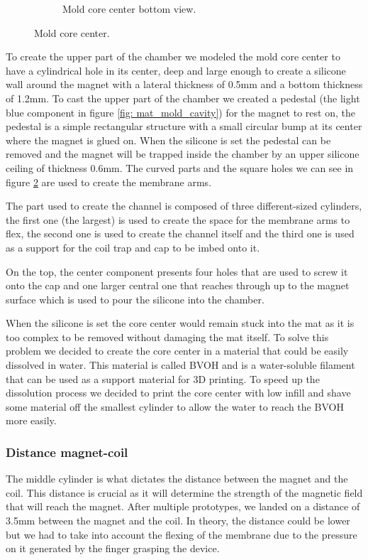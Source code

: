 \begin{figure}
\begin{subfigure}[b]{0.475\textwidth}
{        }
        \caption{Mold core center bottom view.}
        \label{fig: mat_mold_core_center_btm}
    \end{subfigure}
    \caption{Mold core center.}
    \label{fig: mat_mold_core_center}
\end{figure}
To create the upper part of the chamber we modeled the mold core center to have a cylindrical hole in its center, deep and large enough to create a silicone wall around the magnet with a lateral thickness of 0.5mm and a bottom thickness of 1.2mm.
To cast the upper part of the chamber we created a pedestal (the light blue component in figure \ref{fig: mat_mold_cavity}) for the magnet to rest on, the pedestal is a simple rectangular structure with a small circular bump at its center where the magnet is glued on.
When the silicone is set the pedestal can be removed and the magnet will be trapped inside the chamber by an upper silicone ceiling of thickness 0.6mm.
The curved parts and the square holes we can see in figure \ref{fig: mat_mold_core_center} are used to create the membrane arms.

The part used to create the channel is composed of three different-sized cylinders, the first one (the largest) is used to create the space for the membrane arms to flex, the second one is used to create the channel itself and the third one is used as a support for the coil trap and cap to be imbed onto it.

On the top, the center component presents four holes that are used to screw it onto the cap and one larger central one that reaches through up to the magnet surface which is used to pour the silicone into the chamber.

When the silicone is set the core center would remain stuck into the mat as it is too complex to be removed without damaging the mat itself.
To solve this problem we decided to create the core center in a material that could be easily dissolved in water.
This material is called BVOH and is a water-soluble filament that can be used as a support material for 3D printing.
To speed up the dissolution process we decided to print the core center with low infill and shave some material off the smallest cylinder to allow the water to reach the BVOH more easily.

\subsubsection{Distance magnet-coil}
The middle cylinder is what dictates the distance between the magnet and the coil.
This distance is crucial as it will determine the strength of the magnetic field that will reach the magnet.
After multiple prototypes, we landed on a distance of 3.5mm between the magnet and the coil.
In theory, the distance could be lower but we had to take into account the flexing of the membrane due to the pressure on it generated by the finger grasping the device.

